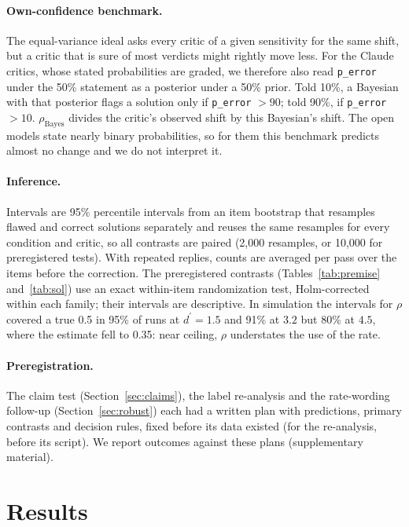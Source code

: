 \documentclass[letterpaper]{article} %
\newcommand{\dprime}{d^{\prime}}
\begin{document}
\paragraph{Own-confidence benchmark.} The equal-variance ideal asks every critic of a given sensitivity for the same shift, but a critic that is sure of most verdicts might rightly move less. For the Claude critics, whose stated probabilities are graded, we therefore also read \texttt{p\_error} under the 50\% statement as a posterior under a 50\% prior. Told 10\%, a Bayesian with that posterior flags a solution only if \texttt{p\_error} $>90$; told 90\%, if \texttt{p\_error} $>10$. $\rho_{\mathrm{Bayes}}$ divides the critic's observed shift by this Bayesian's shift. The open models state nearly binary probabilities, so for them this benchmark predicts almost no change and we do not interpret it.

\paragraph{Inference.} Intervals are 95\% percentile intervals from an item bootstrap that resamples flawed and correct solutions separately and reuses the same resamples for every condition and critic, so all contrasts are paired (2,000 resamples, or 10,000 for preregistered tests). With repeated replies, counts are averaged per pass over the items before the correction. The preregistered contrasts (Tables~\ref{tab:premise} and~\ref{tab:sol}) use an exact within-item randomization test, Holm-corrected within each family; their intervals are descriptive. In simulation the intervals for $\rho$ covered a true 0.5 in 95\% of runs at $\dprime=1.5$ and 91\% at $3.2$ but 80\% at $4.5$, where the estimate fell to 0.35: near ceiling, $\rho$ understates the use of the rate.

\paragraph{Preregistration.} The claim test (Section~\ref{sec:claims}), the label re-analysis and the rate-wording follow-up (Section~\ref{sec:robust}) each had a written plan with predictions, primary contrasts and decision rules, fixed before its data existed (for the re-analysis, before its script). We report outcomes against these plans (supplementary material).

\section{Results}
\end{document}
